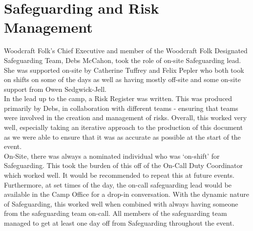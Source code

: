 \chapter{Safeguarding and Risk Management}
Woodcraft Folk's Chief Executive and member of the Woodcraft Folk Designated Safeguarding Team, Debs McCahon, took the role of on-site Safeguarding lead. She was supported on-site by Catherine Tuffrey and Felix Pepler who both took on shifts on some of the days as well as having mostly off-site and some on-site support from Owen Sedgwick-Jell.\\

In the lead up to the camp, a Risk Register was written. This was produced primarily by Debs, in collaboration with different teams - ensuring that teams were involved in the creation and management of risks. Overall, this worked very well, especially taking an iterative approach to the production of this document as we were able to ensure that it was as accurate as possible at the start of the event. \\

On-Site, there was always a nominated individual who was `on-shift' for Safeguarding. This took the burden of this off of the On-Call Duty Coordinator which worked well. It would be recommended to repeat this at future events. Furthermore, at set times of the day, the on-call safeguarding lead would be available in the Camp Office for a drop-in conversation. With the dynamic nature of Safeguarding, this worked well when combined with always having someone from the safeguarding team on-call. All members of the safeguarding team managed to get at least one day off from Safeguarding throughout the event.

